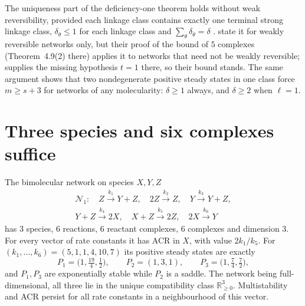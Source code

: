 \documentclass[11pt,a4paper]{report}
\newcommand{\Rnn}{\mathbb{R}_{\ge 0}}
\begin{document}
\begin{remark}\label{rem:def-one}
The uniqueness part of the deficiency-one theorem holds without weak reversibility, provided each linkage class
contains exactly one terminal strong linkage class, $\delta_\theta\le1$ for each linkage class and
$\sum_\theta\delta_\theta=\delta$ \autocite{Feinberg1995}. \textcite[Lemma~2.5]{KNS2024} state it for weakly reversible
networks only, but their proof of the bound of $5$ complexes (Theorem~4.9(2) there) applies it to networks that need
not be weakly reversible;  supplies the missing hypothesis $t=1$ there, so their bound stands. The
same argument shows that two nondegenerate positive steady states in one class force $m\ge s+3$ for networks of any
molecularity: $\delta\ge1$ always, and $\delta\ge2$ when $\ell=1$.
\end{remark}

\section{Three species and six complexes suffice}\label{sec:three}

\begin{theorem}\label{thm:three-species}
The bimolecular network on species $X,Y,Z$
\[
\begin{gathered}
\mathcal N_1:\quad Z\xrightarrow{k_1}Y+Z,\quad 2Z\xrightarrow{k_2}Z,\quad Y\xrightarrow{k_3}Y+Z,\\
Y+Z\xrightarrow{k_4}2X,\quad X+Z\xrightarrow{k_5}2Z,\quad 2X\xrightarrow{k_6}Y
\end{gathered}
\]
has $3$ species, $6$ reactions, $6$ reactant complexes, $6$ complexes and dimension $3$. For every vector of rate
constants it has ACR in $X$, with value $2k_1/k_5$. For $(k_1,\dots,k_6)=(5,1,1,4,10,7)$ its positive steady states
are exactly
\[
P_1=\bigl(1,\tfrac{19}{4},\tfrac12\bigr),\qquad P_2=(1,3,1),\qquad P_3=\bigl(1,\tfrac74,\tfrac72\bigr),
\]
and $P_1,P_3$ are exponentially stable while $P_2$ is a saddle. The network being full-dimensional, all three lie in
the unique compatibility class $\Rnn^3$. Multistability and ACR persist for all rate constants in a neighbourhood of
this vector.
\end{theorem}
\end{document}
